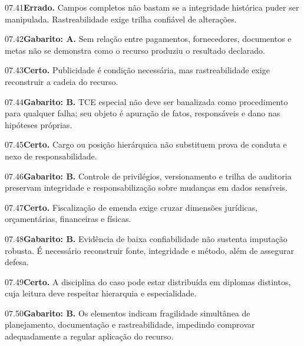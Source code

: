 \begin{solucao}{07.41}\textbf{Errado.} Campos completos não bastam se a integridade histórica puder ser manipulada. Rastreabilidade exige trilha confiável de alterações.\end{solucao}
\begin{solucao}{07.42}\textbf{Gabarito: A.} Sem relação entre pagamentos, fornecedores, documentos e metas não se demonstra como o recurso produziu o resultado declarado.\end{solucao}
\begin{solucao}{07.43}\textbf{Certo.} Publicidade é condição necessária, mas rastreabilidade exige reconstruir a cadeia do recurso.\end{solucao}
\begin{solucao}{07.44}\textbf{Gabarito: B.} TCE especial não deve ser banalizada como procedimento para qualquer falha; seu objeto é apuração de fatos, responsáveis e dano nas hipóteses próprias.\end{solucao}
\begin{solucao}{07.45}\textbf{Certo.} Cargo ou posição hierárquica não substituem prova de conduta e nexo de responsabilidade.\end{solucao}
\begin{solucao}{07.46}\textbf{Gabarito: B.} Controle de privilégios, versionamento e trilha de auditoria preservam integridade e responsabilização sobre mudanças em dados sensíveis.\end{solucao}
\begin{solucao}{07.47}\textbf{Certo.} Fiscalização de emenda exige cruzar dimensões jurídicas, orçamentárias, financeiras e físicas.\end{solucao}
\begin{solucao}{07.48}\textbf{Gabarito: B.} Evidência de baixa confiabilidade não sustenta imputação robusta. É necessário reconstruir fonte, integridade e método, além de assegurar defesa.\end{solucao}
\begin{solucao}{07.49}\textbf{Certo.} A disciplina do caso pode estar distribuída em diplomas distintos, cuja leitura deve respeitar hierarquia e especialidade.\end{solucao}
\begin{solucao}{07.50}\textbf{Gabarito: B.} Os elementos indicam fragilidade simultânea de planejamento, documentação e rastreabilidade, impedindo comprovar adequadamente a regular aplicação do recurso.\end{solucao}

